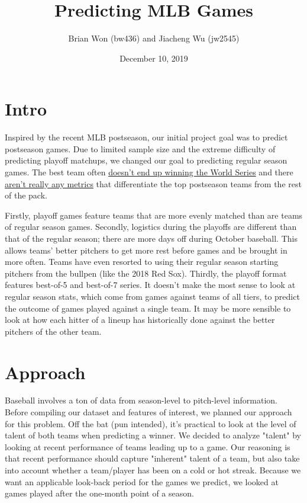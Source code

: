 \documentclass[12pt,onecolumn]{article}
\begin{document}
\DontPrintSemicolon
\title{Predicting MLB Games}
\author{Brian Won (bw436) and Jiacheng Wu (jw2545)}
\date{December 10, 2019}
\maketitle

\section*{Intro}
Inspired by the recent MLB postseason, our initial project goal was to predict postseason games. Due to limited sample size and the extreme difficulty of predicting playoff matchups, we changed our goal to predicting regular season games. The best team often \href{https://www.espn.com/mlb/story/_/page/playoffs16_whydontthebestteamswinitall/why-difficult-best-mlb-teams-win-all}{doesn't end up winning the World Series} and there \href{https://theathletic.com/1234635/2019/09/24/sarris-what-if-anything-predicts-a-teams-success-in-the-postseason/}{aren't really any metrics} that differentiate the top postseason teams from the rest of the pack.

Firstly, playoff games feature teams that are more evenly matched than are teams of regular season games. Secondly, logistics during the playoffs are different than that of the regular season; there are more days off during October baseball. This allows teams' better pitchers to get more rest before games and be brought in more often. Teams have even resorted to using their regular season starting pitchers from the bullpen (like the 2018 Red Sox). Thirdly, the playoff format features best-of-5 and best-of-7 series. It doesn't make the most sense to look at regular season stats, which come from games against teams of all tiers, to predict the outcome of games played against a single team. It may be more sensible to look at how each hitter of a lineup has historically done against the better pitchers of the other team.

\section*{Approach}
Baseball involves a ton of data from season-level to pitch-level information. Before compiling our dataset and features of interest, we planned our approach for this problem. Off the bat (pun intended), it's practical to look at the level of talent of both teams when predicting a winner. We decided to analyze "talent" by looking at recent performance of teams leading up to a game. Our reasoning is that recent performance should capture "inherent" talent of a team, but also take into account whether a team/player has been on a cold or hot streak. Because we want an applicable look-back period for the games we predict, we looked at games played after the one-month point of a season.
\end{document}
